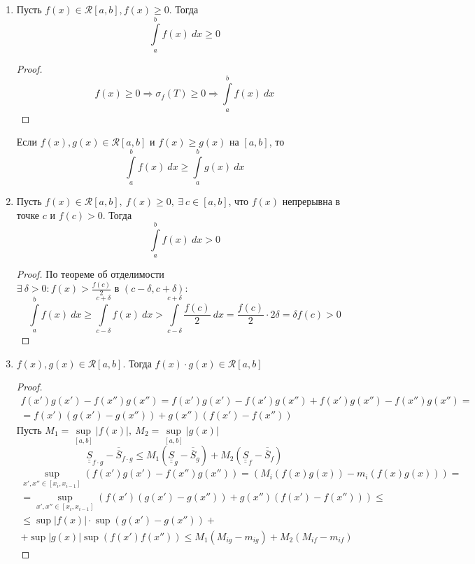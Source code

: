 \begin{enumerate}
\[\int\limits_{a}^{b}(\alpha f(x)+\beta g(x))\ dx=\alpha\cdot \int\limits_{a}^{b} f(x)\ dx+\beta\cdot \int\limits_{a}^{b}g(x)\ dx\]
\begin{proof}
    \[\sigma_{\alpha f(x)+\beta g(x)}(T)=\alpha\sigma_f(T)+\beta\sigma_g(T)\]
\end{proof}
\item Пусть $f(x)\in \mathcal{R}[a,b], f(x)\geq 0$. Тогда
\[\int\limits_{a}^{b}f(x)\ dx\geq 0\]
\begin{proof}
    \[f(x)\geq 0 \Rightarrow \sigma_f(T)\geq 0 \Rightarrow \int\limits_{a}^{b} f(x)\ dx\]
\end{proof} 
\begin{consequense}
    Если $f(x), g(x)\in \mathcal{R}[a,b]$ и $f(x)\geq g(x)$ на $[a,b]$, то 
    \[\int\limits_{a}^{b}f(x)\ dx\geq \int\limits_{a}^{b}g(x)\ dx\]
\end{consequense}
\item Пусть $f(x)\in \mathcal{R}[a,b],\ f(x)\geq 0,\ \exists\ c\in[a,b]$, что $f(x)$ непрерывна в точке $c$ и $f(c)>0$. Тогда 
\[\int\limits_{a}^{b}f(x)\ dx>0\]
\begin{proof}
    По теореме об отделимости\\
    $\exists\ \delta>0: f(x)>\frac{f(c)}{2}$ в $(c-\delta, c+\delta):$
    \[\int\limits_{a}^{b}f(x)\ dx\geq \int\limits_{c-\delta}^{c+\delta}f(x)\ dx>\int\limits_{c-\delta}^{c+\delta}\frac{f(c)}{2}\ dx=\frac{f(c)}{2}\cdot 2\delta=\delta f(c)>0\]
\end{proof} 
\item
$f(x), g(x)\in \mathcal{R}[a,b]$. Тогда $f(x)\cdot g(x)\in \mathcal{R}[a,b]$
\begin{proof}
    \begin{multline}
        f(x')g(x')-f(x'')g(x'')=f(x')g(x')-f(x')g(x'')+f(x')g(x'')-f(x'')g(x'')=\\
        =f(x')(g(x')-g(x''))+g(x'')(f(x')-f(x''))
    \end{multline}
    Пусть $M_1=\sup\limits_{[a,b]}|f(x)|,\ M_2=\sup\limits_{[a,b]}|g(x)|$
    \begin{equation*}
        \underline{\underline{S}}_{f\cdot g}-\overline{\overline{S}}_{f\cdot g}\leq M_1(\underline{\underline{S}}_g-\overline{\overline{S}}_g)+M_2(\underline{\underline{S}}_f-\overline{\overline{S}}_f)
    \end{equation*}
    \begin{multline*}
        \sup\limits_{x',x''\in[x_i,x_{i-1}]}(f(x')g(x')-f(x'')g(x''))=(M_i(f(x)g(x))-m_i(f(x)g(x)))=\\
        =\sup\limits_{x',x''\in[x_i,x_{i-1}]}(f(x')(g(x')-g(x''))+g(x'')(f(x')-f(x'')))\leq\\
        \leq \sup|f(x)|\cdot \sup(g(x')-g(x''))+\\
        +\sup|g(x)|\sup(f(x')f(x''))\leq M_1 (M_{ig}-m_{ig})+M_2(M_{if}-m_{if})
    \end{multline*}
\end{proof} 
\end{enumerate}
